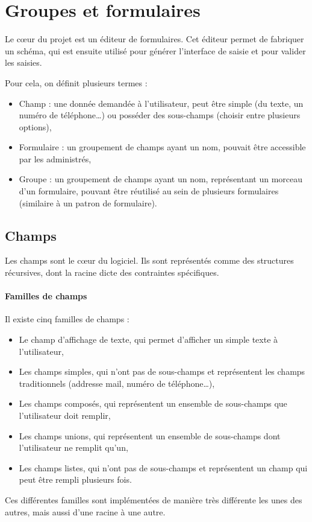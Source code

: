 \section{Groupes et formulaires}\label{sec:groupes-et-formulaires}

Le cœur du projet est un éditeur de formulaires.
Cet éditeur permet de fabriquer un schéma, qui est ensuite utilisé pour générer l'interface de saisie et pour valider les saisies.

Pour cela, on définit plusieurs termes :
\begin{itemize}
	\item Champ : une donnée demandée à l'utilisateur, peut être simple (du texte, un numéro de téléphone…) ou posséder des sous-champs (choisir entre plusieurs options),
	\item Formulaire : un groupement de champs ayant un nom, pouvait être accessible par les administrés,
	\item Groupe : un groupement de champs ayant un nom, représentant un morceau d'un formulaire, pouvant être réutilisé au sein de plusieurs formulaires (similaire à un patron de formulaire).
\end{itemize}

\subsection{Champs}\label{subsec:conception-des-champs}

Les champs sont le cœur du logiciel.
Ils sont représentés comme des structures récursives, dont la racine dicte des contraintes spécifiques.

\paragraph{Familles de champs}
Il existe cinq familles de champs :
\begin{itemize}
	\item Le champ d'affichage de texte, qui permet d'afficher un simple texte à l'utilisateur,
	\item Les champs simples, qui n'ont pas de sous-champs et représentent les champs traditionnels (addresse mail, numéro de téléphone…),
	\item Les champs composés, qui représentent un ensemble de sous-champs que l'utilisateur doit remplir,
	\item Les champs unions, qui représentent un ensemble de sous-champs dont l'utilisateur ne remplit qu'un,
	\item Les champs listes, qui n'ont pas de sous-champs et représentent un champ qui peut être rempli plusieurs fois.
\end{itemize}
Ces différentes familles sont implémentées de manière très différente les unes des autres, mais aussi d'une racine à une autre.

